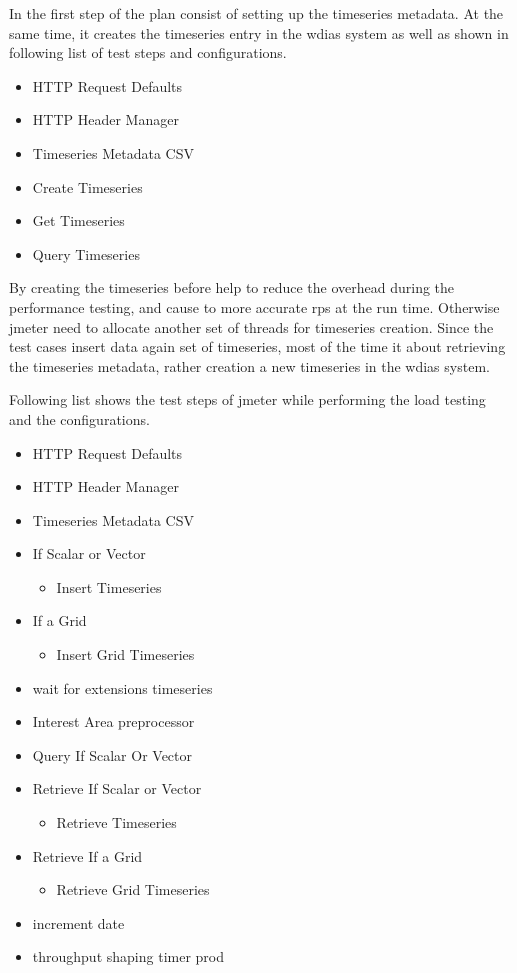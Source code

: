 In the first step of the plan consist of setting up the timeseries metadata. At the same time, it creates the timeseries entry in the \acrshort{wdias} system as well as shown in following list of test steps and configurations.

\begin{itemize}
    \item HTTP Request Defaults
    \item HTTP Header Manager
    \item Timeseries Metadata CSV
    \item Create Timeseries
    \item Get Timeseries
    \item Query Timeseries
\end{itemize}

By creating the timeseries before help to reduce the overhead during the performance testing, and cause to more accurate \acrshort{rps} at the run time.
Otherwise \acrshort{jmeter} need to allocate another set of threads for timeseries creation. Since the test cases insert data again set of timeseries, most of the time it about retrieving the timeseries metadata, rather creation a new timeseries in the \acrshort{wdias} system.

Following list shows the test steps of \acrshort{jmeter} while performing the load testing and the configurations.

\begin{itemize}
    \item HTTP Request Defaults
    \item HTTP Header Manager
    \item Timeseries Metadata CSV
    \item If Scalar or Vector
        \begin{itemize}
            \item Insert Timeseries
        \end{itemize}
    \item If a Grid
    \begin{itemize}
        \item Insert Grid Timeseries
    \end{itemize}
    \item wait for extensions timeseries
    \item Interest Area preprocessor
    \item Query If Scalar Or Vector
    \item Retrieve If Scalar or Vector
        \begin{itemize}
            \item Retrieve Timeseries
        \end{itemize}
    \item Retrieve If a Grid
    \begin{itemize}
        \item Retrieve Grid Timeseries
    \end{itemize}
    \item increment date
    \item throughput shaping timer prod
\end{itemize}

